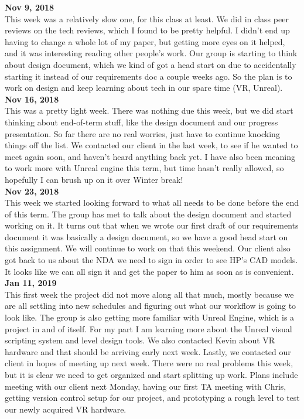 \textbf{Nov 9, 2018}\\
This week was a relatively slow one, for this class at least. We did in class peer reviews on the tech reviews, which I found to be pretty helpful. I didn't end up having to change a whole lot of my paper, but getting more eyes on it helped, and it was interesting reading other people's work. Our group is starting to think about design document, which we kind of got  a head start on due to accidentally starting it instead of our requirements doc a couple weeks ago.
So the plan is to work on design and keep learning about tech in our spare time (VR, Unreal).\\

\textbf{Nov 16, 2018}\\
This was a pretty light week. There was nothing due this week, but we did start thinking about end-of-term stuff, like the design document and our progress presentation. So far there are no real worries, just have to continue knocking things off the list.
We contacted our client in the last week, to see if he wanted to meet again soon, and haven't heard anything back yet. I have also been meaning to work more with Unreal engine this term, but time hasn't really allowed, so hopefully I can brush up on it over Winter break!\\

\textbf{Nov 23, 2018}\\
This week we started looking forward to what all needs to be done before the end of this term. The group has met to talk about the design document and started working on it. It turns out that when we wrote our first draft of our requirements document it was basically a design document, so we have a good head start on this assignment. We will continue to work on that this weekend. Our client also got back to us about the NDA we need to sign in order to see HP's CAD models. It looks like we can all sign it and get the paper to him as soon as is convenient.\\

\textbf{Jan 11, 2019}\\
This first week the project did not move along all that much, mostly because we are all settling into new schedules and figuring out what our workflow is going to look like. The group is also getting more familiar with Unreal Engine, which is a project in and of itself. For my part I am learning more about the Unreal visual scripting system and level design tools. We also contacted Kevin about VR hardware and that should be arriving early next week. Lastly, we contacted our client in hopes of meeting up next week.
There were no real problems this week, but it is clear we need to get organized and start splitting up work.
Plans include meeting with our client next Monday, having our first TA meeting with Chris, getting version control setup for our project, and prototyping a rough level to test our newly acquired VR hardware.\\

